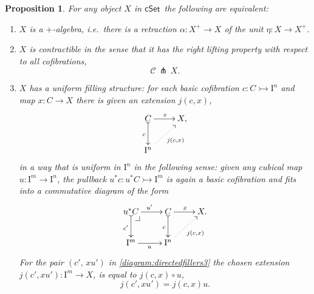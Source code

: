 \documentclass[11pt]{article}
\makeatletter
\newcommand{\cSet}{\ensuremath{\mathsf{cSet}}}
\newcommand{\pbcorner}[1][dr]{\save*!/#1-1.2pc/#1:(-1,1)@^{|-}\restore}
\newcommand{\mono}{\ensuremath{\rightarrowtail}}
\newcommand{\I}{\ensuremath{\mathrm{I}}}
\newtheorem{proposition}[theorem]{Proposition}
\theoremstyle{remark}
\theoremstyle{definition}
\makeatother
\begin{document}
\begin{proposition}\label{prop:uniformstructequiv} For any object $X$ in \cSet\ the following are equivalent:
\begin{enumerate}
\item $X$ is a \emph{$+$-algebra}, i.e.\ there is a retraction $\alpha :X^+ \to X$ of the unit $\eta : X\to X^+$.
\item $X$ is  \emph{contractible} in the sense that it has the right lifting property with respect to all cofibrations,
\[
\mathcal{C}\, \pitchfork\,X.
\]
\item $X$ has a \emph{uniform filling structure}: 
for each basic cofibration $c : C \mono \I^{n}$ and map $x : C\to X$ there is given an extension $j(c,x)$,
\begin{equation}\label{diagram:directedfillers}
\xymatrix{
C \ar@{>->}[d]_{c} \ar[r]^{x} & X, \\
\I^{n}\ar@{.>}[ru]_{j(c,x)} &
}
\end{equation}
in a way that is \emph{uniform in $\I^n$} in the following sense: given any cubical map $u : \I^m \to \I^n$, the pullback $u^*c : u^*C\mono \I^m$ is again a basic cofibration and fits into a commutative diagram of the form
\begin{equation}\label{diagram:directedfillers3}
\xymatrix{
u^*C \ar@{>->}[d]_{c'} \ar[r]^{u'} \pbcorner &  C \ar@{>->}[d]_{c} \ar[r]^{x} & X. \\
\I^{m} \ar[r]_{u} & \I^{n} \ar@{.>}[ru]_{j(c,x)} &
}
\end{equation}
For the pair $(c',\, xu')$ in \eqref{diagram:directedfillers3} the chosen extension $j(c',xu'): \I^m \to X$, is equal to  $j(c,x)\circ u$,
\begin{equation}\label{eq:uniformfillers}
j(c',xu') = j(c,x) u.
\end{equation}
\end{enumerate}
\end{proposition}
\end{document}
